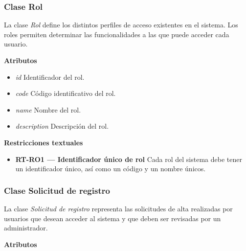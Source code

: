 \subsubsection{Clase Rol}

La clase \textit{Rol} define los distintos perfiles de acceso existentes en el sistema. Los roles permiten determinar las funcionalidades a las que puede acceder cada usuario.

\textbf{Atributos}

\begin{itemize}

      \item \textit{id}
            Identificador del rol.
      \item \textit{code}
            Código identificativo del rol.
      \item \textit{name}
            Nombre del rol.
      \item \textit{description}
            Descripción del rol.

\end{itemize}

\textbf{Restricciones textuales}

\begin{itemize}

      \item \textbf{RT-RO1 — Identificador único de rol}
            Cada rol del sistema debe tener un identificador único, así como un código y un nombre únicos.

\end{itemize}

\subsubsection{Clase Solicitud de registro}

La clase \textit{Solicitud de registro} representa las solicitudes de alta realizadas por usuarios que desean acceder al sistema y que deben ser revisadas por un administrador.

\textbf{Atributos}

